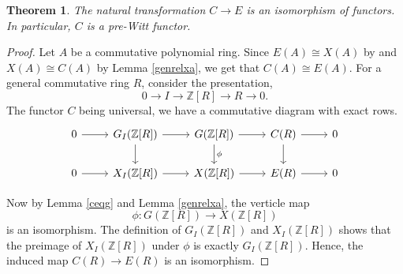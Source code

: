\documentclass[10pt]{amsart}
\theoremstyle{plain}
\newtheorem{theorem}[thm]{Theorem}
\theoremstyle{definition}
\newcommand{\Z}{{\mathbb Z}}
\begin{document}
\begin{theorem}\label{cise}
The natural transformation $C \to E$ is an isomorphism of functors. In particular, $C$ is a pre-Witt functor.
\end{theorem}
\begin{proof} Let $A$ be a commutative polynomial ring. Since $E(A) \cong X(A)$ by \cite[Cor. 2.10]{cd} and $X(A) \cong C(A)$ by Lemma \ref{genrelxa}, we get that $C(A) \cong E(A)$. For a general commutative ring $R$, consider the presentation, $$0 \to I \to \Z[R] \to R \to 0.$$
The functor $C$ being universal, we have a commutative diagram with exact rows.	
\[
\begin{tikzcd}
0 \arrow[r] & G_I(\Z[R]) \arrow[r] \arrow[d] & G(\Z[R]) \arrow[r] \arrow[d, "\phi"] & C(R) \arrow[r] \arrow[d] & 0 \\
0 \arrow[r] & X_I(\Z[R]) \arrow[r]           & X(\Z[R]) \arrow[r]           & E(R) \arrow[r]           & 0
\end{tikzcd}
\]

\noindent Now by Lemma \ref{ceqg} and Lemma \ref{genrelxa}, the verticle map $$\phi: G(\Z[R]) \to X(\Z[R])$$ is an isomorphism. The definition of $G_I(\Z[R])$ and $X_I(\Z[R])$ shows that the preimage of $X_I(\Z[R])$ under $\phi$ is exactly $G_I(\Z[R])$.  Hence, the induced map $C(R) \to E(R)$ is an isomorphism. 
\end{proof}
\vspace{1mm}
\end{document}
